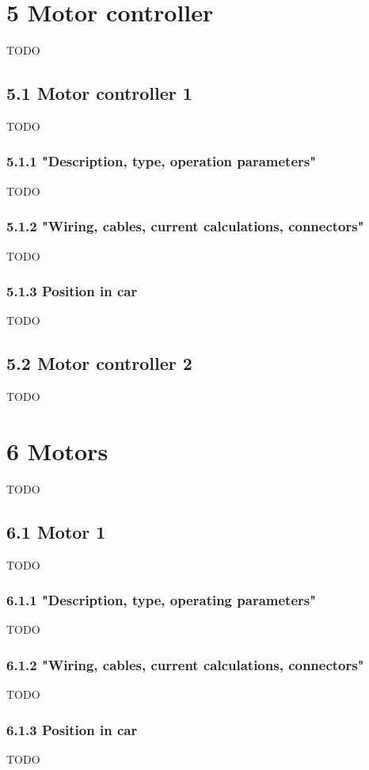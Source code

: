 \documentclass{article}
\begin{document}
\section*{5 Motor controller}
TODO

\subsection*{5.1 Motor controller 1}
TODO

\subsubsection*{5.1.1 "Description, type, operation parameters"}
TODO

\subsubsection*{5.1.2 "Wiring, cables, current calculations, connectors"}
TODO

\subsubsection*{5.1.3 Position in car}
TODO

\subsection*{5.2 Motor controller 2}
TODO

\section*{6 Motors}
TODO

\subsection*{6.1 Motor 1}
TODO

\subsubsection*{6.1.1 "Description, type, operating parameters"}
TODO

\subsubsection*{6.1.2 "Wiring, cables, current calculations, connectors"}
TODO

\subsubsection*{6.1.3 Position in car}
TODO
\end{document}
